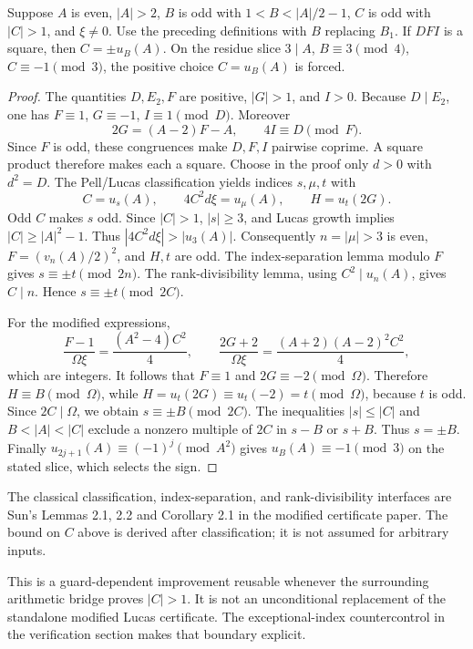 \begin{theorem}\label{thm:reliability}
Suppose $A$ is even, $|A|>2$, $B$ is odd with
$1<B<|A|/2-1$, $C$ is odd with $|C|>1$, and $\xi\ne0$.
Use the preceding definitions with $B$ replacing $B_1$.
If $DFI$ is a square, then $C=\pm u_B(A)$.
On the residue slice $3\mid A$, $B\equiv3\pmod4$,
$C\equiv-1\pmod3$, the positive choice $C=u_B(A)$ is forced.
\end{theorem}
\begin{proof}
The quantities $D,E_2,F$ are positive, $|G|>1$, and $I>0$.
Because $D\mid E_2$, one has $F\equiv1$, $G\equiv-1$,
$I\equiv1\pmod D$. Moreover
\[
 2G=(A-2)F-A,\qquad 4I\equiv D\pmod F.
\]
Since $F$ is odd, these congruences make $D,F,I$ pairwise coprime.
A square product therefore makes each a square. Choose in the proof only
$d>0$ with $d^2=D$. The Pell/Lucas classification yields indices $s,\mu,t$
with
\[
 C=u_s(A),\qquad 4C^2d\xi=u_\mu(A),\qquad H=u_t(2G).
\]
Odd $C$ makes $s$ odd. Since $|C|>1$, $|s|\ge3$, and Lucas growth
implies $|C|\ge|A|^2-1$. Thus $|4C^2d\xi|>|u_3(A)|$.
Consequently $n=|\mu|>3$ is even, $F=(v_n(A)/2)^2$, and $H,t$ are odd.
The index-separation lemma modulo $F$ gives $s\equiv\pm t\pmod{2n}$.
The rank-divisibility lemma, using $C^2\mid u_n(A)$, gives $C\mid n$.
Hence $s\equiv\pm t\pmod{2C}$.

For the modified expressions,
\[
 \frac{F-1}{\Omega\xi}=\frac{(A^2-4)C^2}{4},\qquad
 \frac{2G+2}{\Omega\xi}=\frac{(A+2)(A-2)^2C^2}{4},
\]
which are integers. It follows that $F\equiv1$ and $2G\equiv-2\pmod\Omega$.
Therefore $H\equiv B\pmod\Omega$, while
$H=u_t(2G)\equiv u_t(-2)=t\pmod\Omega$, because $t$ is odd.
Since $2C\mid\Omega$, we obtain $s\equiv\pm B\pmod{2C}$.
The inequalities $|s|\le|C|$ and $B<|A|<|C|$ exclude a nonzero multiple
of $2C$ in $s-B$ or $s+B$. Thus $s=\pm B$.
Finally $u_{2j+1}(A)\equiv(-1)^j\pmod{A^2}$ gives
$u_B(A)\equiv-1\pmod3$ on the stated slice, which selects the sign.
\end{proof}
The classical classification, index-separation, and rank-divisibility
interfaces are Sun's Lemmas 2.1, 2.2 and Corollary 2.1 in the modified
certificate paper. The bound on $C$ above is derived after classification;
it is not assumed for arbitrary inputs.

This is a guard-dependent improvement reusable whenever the surrounding
arithmetic bridge proves $|C|>1$. It is not an unconditional replacement
of the standalone modified Lucas certificate. The exceptional-index
countercontrol in the verification section makes that boundary explicit.

